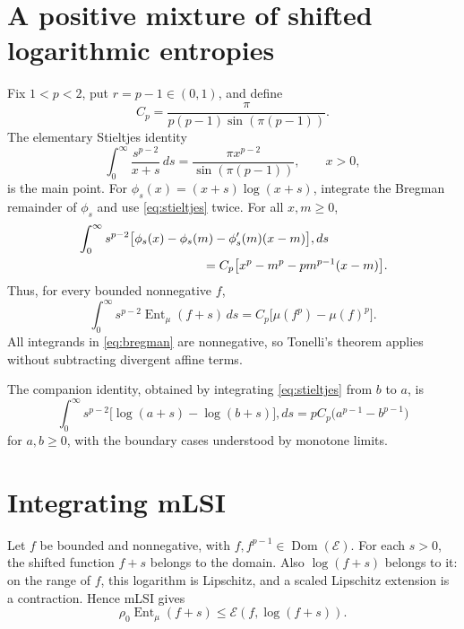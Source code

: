 \documentclass[11pt]{article}
\newcommand{\E}{\mathcal E}
\newcommand{\Ent}{\operatorname{Ent}}
\begin{document}
\section{A positive mixture of shifted logarithmic entropies}

Fix $1<p<2$, put $r=p-1\in(0,1)$, and define
\[
 C_p=\frac{\pi}{p(p-1)\sin(\pi(p-1))}.
\]
The elementary Stieltjes identity
\begin{equation}\label{eq:stieltjes}
 \int_0^\infty \frac{s^{p-2}}{x+s}\,ds
 =\frac{\pi x^{p-2}}{\sin(\pi(p-1))},\qquad x>0,
\end{equation}
is the main point. For $\phi_s(x)=(x+s)\log(x+s)$, integrate the Bregman
remainder of $\phi_s$ and use \eqref{eq:stieltjes} twice. For all $x,m\geq0$,
\begin{align}
 &\int_0^\infty s^{p-2}
 \bigl[\phi_s(x)-\phi_s(m)-\phi_s'(m)(x-m)\bigr],ds \notag\\
 &\hspace{35mm}=C_p\bigl[x^p-m^p-pm^{p-1}(x-m)\bigr].
 \label{eq:bregman}
\end{align}
Thus, for every bounded nonnegative $f$,
\begin{equation}\label{eq:entropy-mixture}
 \int_0^\infty s^{p-2}\Ent_\mu(f+s)\,ds
 =C_p\bigl[\mu(f^p)-\mu(f)^p\bigr].
\end{equation}
All integrands in \eqref{eq:bregman} are nonnegative, so Tonelli's theorem
applies without subtracting divergent affine terms.

The companion identity, obtained by integrating \eqref{eq:stieltjes} from
$b$ to $a$, is
\begin{equation}\label{eq:log-mixture}
 \int_0^\infty s^{p-2}\bigl[\log(a+s)-\log(b+s)\bigr],ds
 =pC_p\bigl(a^{p-1}-b^{p-1}\bigr)
\end{equation}
for $a,b\geq0$, with the boundary cases understood by monotone limits.

\section{Integrating mLSI}

Let $f$ be bounded and nonnegative, with $f,f^{p-1}\in\operatorname{Dom}(\E)$.
For each $s>0$, the shifted function $f+s$ belongs to the domain. Also
$\log(f+s)$ belongs to it: on the range of $f$, this logarithm is Lipschitz,
and a scaled Lipschitz extension is a contraction. Hence mLSI gives
\begin{equation}\label{eq:shifted-mlsi}
 \rho_0\Ent_\mu(f+s)\leq \E(f,\log(f+s)).
\end{equation}
\end{document}
